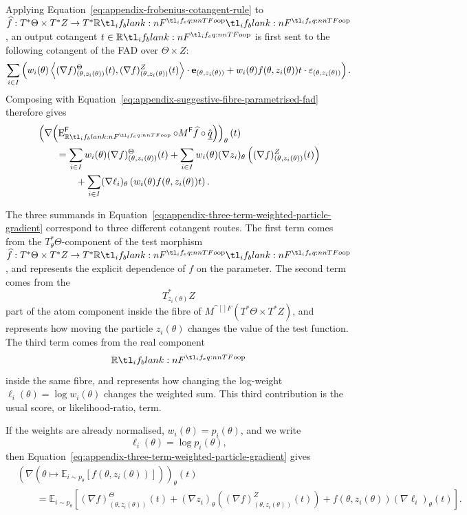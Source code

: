 \documentclass[11pt,a4paper]{article}
\theoremstyle{definition}
\theoremstyle{remark}
\providecommand{\vect}[1]{\mathbf{#1}}
\begin{document}
Applying Equation~\eqref{eq:appendix-frobenius-cotangent-rule} to
\(\widehat f:T^*\Theta\times T^*Z\to\TR\), an output cotangent
\(t\in\R\) is first sent to the following cotangent of the FAD over
\(\Theta\times Z\):
\[
  \sum_{i\in I}
  \left(
    w_i(\theta)
    \tuple{
      (\nabla f)^\Theta_{(\theta,z_i(\theta))}(t),
      (\nabla f)^Z_{(\theta,z_i(\theta))}(t)
    }
    \cdot\vect{e}_{(\theta,z_i(\theta))}
    +
    w_i(\theta)f(\theta,z_i(\theta))t
    \cdot\vect{\varepsilon}_{(\theta,z_i(\theta))}
  \right).
\]
Composing with Equation~\eqref{eq:appendix-suggestive-fibre-parametrised-fad}
therefore gives
\begin{equation}
  \label{eq:appendix-three-term-weighted-particle-gradient}
  \begin{aligned}
  &
  \left(
    \nabla\!\left(
      \opn{E}^{\cat[]{F}}_{\R}
      \circ
      M^{\cat[]{F}}\widehat f
      \circ
      \hat{\underline q}
    \right)
  \right)_\theta(t)
  \\
  &\qquad =
  \sum_{i\in I}
  w_i(\theta)(\nabla f)^\Theta_{(\theta,z_i(\theta))}(t)
  +
  \sum_{i\in I}
  w_i(\theta)
  (\nabla z_i)_\theta
  \left(
    (\nabla f)^Z_{(\theta,z_i(\theta))}(t)
  \right)
  \\
  &\qquad\qquad
  +
  \sum_{i\in I}
  (\nabla\ell_i)_\theta
  \left(
    w_i(\theta)f(\theta,z_i(\theta))t
  \right).
  \end{aligned}
\end{equation}

The three summands in
Equation~\eqref{eq:appendix-three-term-weighted-particle-gradient} correspond to
three different cotangent routes.  The first term comes from the
\(T^*_\theta\Theta\)-component of the test morphism
\(\widehat f:T^*\Theta\times T^*Z\to\TR\), and represents the explicit
dependence of \(f\) on the parameter.  The second term comes from the
\[
  T^*_{z_i(\theta)}Z
\]
part of the atom component inside the fibre of
\(M^{\cat[]{F}}(T^*\Theta\times T^*Z)\), and represents how moving the
particle \(z_i(\theta)\) changes the value of the test function.  The
third term comes from the real component
\[
  \R
\]
inside the same fibre, and represents how changing the log-weight
\(\ell_i(\theta)=\log w_i(\theta)\) changes the weighted sum.  This
third contribution is the usual score, or likelihood-ratio, term.


If the weights are already normalised, \(w_i(\theta)=p_i(\theta)\), and
we write
\[
  \ell_i(\theta)=\log p_i(\theta),
\]
then Equation~\eqref{eq:appendix-three-term-weighted-particle-gradient} gives
\[
  \begin{aligned}
  &
  \left(
    \nabla (\theta\mapsto
    \mathbb E_{i\sim p_\theta}
    \left[
      f(\theta,z_i(\theta))
    \right])
  \right)_\theta(t)
  \\
  &\qquad =
  \mathbb E_{i\sim p_\theta}
  \left[
    (\nabla f)^\Theta_{(\theta,z_i(\theta))}(t)
    +
    (\nabla z_i)_\theta
    \left(
      (\nabla f)^Z_{(\theta,z_i(\theta))}(t)
    \right)
    +
    f(\theta,z_i(\theta))(\nabla\ell_i)_\theta(t)
  \right].
  \end{aligned}
\]
\end{document}

